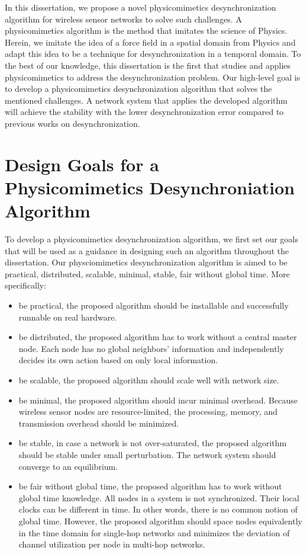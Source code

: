 In this dissertation, we propose a novel physicomimetics desynchronization algorithm for wireless sensor networks to solve such challenges.
A physicomimetics algorithm is the method that imitates the science of Physics.
Herein, we imitate the idea of a force field in a spatial domain from Physics and adapt this idea to be a technique for desynchronization in a temporal domain.
To the best of our knowledge, this dissertation is the first that studies and applies physicomimetics to address the desynchronization problem. 
Our high-level goal is to develop a physicomimetics desynchronization algorithm that solves the mentioned challenges. A network system that applies the developed algorithm will achieve the stability with the lower desynchronization error compared to previous works on desynchronization.


\section{Design Goals for a Physicomimetics Desynchroniation Algorithm}
To develop a physicomimetics desynchronization algorithm, we first set our goals that will be used as a guidance in designing such an algorithm throughout the dissertation. Our physciomimetics desynchronization algorithm is aimed to be practical, distributed, scalable, minimal, stable, fair without global time.
More specifically: 
\label{sec:intro_goal}
\begin{itemize}
\item be practical, the proposed algorithm should be installable and successfully runnable on real hardware. 
\item be distributed, the proposed algorithm has to work without a central master node. Each node has no global neighbors' information and independently decides its own action based on only local information.
\item be scalable, the proposed algorithm should scale well with network size. %
\item be minimal, the proposed algorithm should incur minimal overhead. Because wireless sensor nodes are resource-limited, the processing, memory, and transmission overhead should be minimized.
\item be stable, in case a network is not over-saturated, the proposed algorithm should be stable under small perturbation. The network system should converge to an equilibrium.
\item be fair without global time, the proposed algorithm has to work without global time knowledge.
All nodes in a system is not synchronized. Their local clocks can be different in time. In other words, there is no common notion of global time. However, the proposed algorithm should space nodes equivalently in the time domain for single-hop networks and minimizes the deviation of channel utilization per node in multi-hop networks.
\end{itemize}


